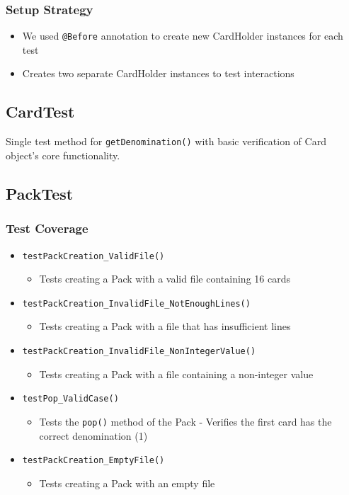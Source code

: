\documentclass{article}
\begin{document}
\subsubsection{Setup Strategy}
\begin{itemize}
    \item We used \texttt{@Before} annotation to create new CardHolder instances for each test
    \item Creates two separate CardHolder instances to test interactions
\end{itemize}

\subsection{CardTest}
Single test method for \texttt{getDenomination()} with basic verification of Card object's core functionality.

\subsection{PackTest}

\subsubsection{Test Coverage}
\begin{itemize}
    \item \texttt{testPackCreation\_ValidFile()}
          \begin{itemize}
              \item Tests creating a Pack with a valid file containing 16 cards
          \end{itemize}
    \item \texttt{testPackCreation\_InvalidFile\_NotEnoughLines()}
          \begin{itemize}
              \item Tests creating a Pack with a file that has insufficient lines
          \end{itemize}
    \item \texttt{testPackCreation\_InvalidFile\_NonIntegerValue()}
          \begin{itemize}
              \item Tests creating a Pack with a file containing a non-integer value
          \end{itemize}
    \item \texttt{testPop\_ValidCase()}
          \begin{itemize}
              \item Tests the \texttt{pop()} method of the Pack - Verifies the first card has the correct denomination (1)
          \end{itemize}
    \item \texttt{testPackCreation\_EmptyFile()}
          \begin{itemize}
              \item Tests creating a Pack with an empty file
          \end{itemize}
\end{itemize}
\end{document}
